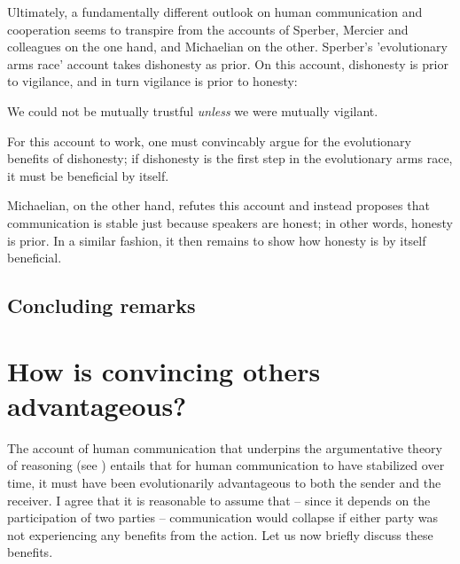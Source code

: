 Ultimately, a fundamentally different outlook on human communication and cooperation seems to transpire from the accounts of Sperber, Mercier and colleagues on the one hand, and Michaelian on the other. Sperber's 'evolutionary arms race' account takes dishonesty as prior. On this account, dishonesty is prior to vigilance, and in turn vigilance is prior to honesty:
\begin{quoting}
    We could not be mutually trustful \emph{unless} we were mutually vigilant.
    \hfill \citep[p.~364]{Sperber10}
\end{quoting}
For this account to work, one must convincably argue for the evolutionary benefits of dishonesty; if dishonesty is the first step in the evolutionary arms race, it must be beneficial by itself.

Michaelian, on the other hand, refutes this account and instead proposes that communication is stable just because speakers are honest; in other words, honesty is prior. In a similar fashion, it then remains to show how honesty is by itself beneficial.



\subsection{Concluding remarks}


\section{How is convincing others advantageous?}


The account of human communication that underpins the argumentative theory of reasoning (see \citet{Sperber01, Sperber10})
entails that for human communication to have stabilized over time, it must have been evolutionarily advantageous to both the sender and the receiver. I agree that it is reasonable to assume that -- since it depends on the participation of two parties -- communication would collapse if either party was not experiencing any benefits from the action. Let us now briefly discuss these benefits.

